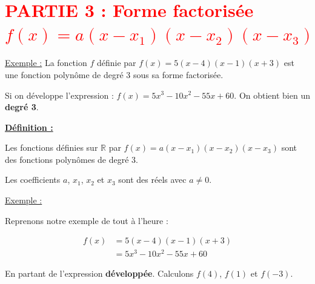 \documentclass[12pt]{article}
\begin{document}
\section*{\textcolor{red}{PARTIE 3 : Forme factorisée $f(x) = a(x - x_1)(x - x_2)(x - x_3)$}}

\vspace{5pt}
\underline{Exemple :}
La fonction $f$ définie par $f(x) = 5(x-4)(x-1)(x+3)$ est une fonction polynôme de degré 3 sous sa forme 
factorisée.

\vspace{5pt}
Si on développe l'expression : $f(x) = 5x^3 - 10x^2 - 55x + 60$. On obtient bien un \textbf{degré 3}.

\vspace{5pt}
\begin{mdframed}[
    linewidth=1pt,
    roundcorner=5pt,
    linecolor=ForestGreen,
    innertopmargin=10pt,
    innerbottommargin=10pt
]
{\color{ForestGreen}
\textbf{\underline{Définition :}}}

\vspace{5pt}
Les fonctions définies sur $\mathbb{R}$ par $f(x) = a(x - x_1)(x - x_2)(x - x_3)$ sont des fonctions 
polynômes de degré 3.

\vspace{5pt}
Les coefficients $a$, $x_1$, $x_2$ et $x_3$ sont des réels avec $a \neq 0$.

\end{mdframed}

\underline{Exemple :}

\vspace{5pt}
Reprenons notre exemple de tout à l'heure : 

\vspace{-10pt}
\begin{align*} %
  f(x) &= 5(x-4)(x-1)(x+3) \\
  &= 5x^3 - 10x^2 - 55x + 60
\end{align*}

\vspace{5pt}
En partant de l'expression \textbf{développée}. Calculons $f(4)$, $f(1)$ et $f(-3)$.

\vspace{0.5cm}
{\color{black!30}\dotfill}

\vspace{0.5cm}
{\color{black!30}\dotfill}

\vspace{0.5cm}
{\color{black!30}\dotfill}
\end{document}
